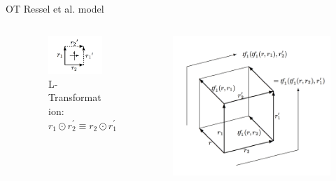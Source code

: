 \documentclass{beamer}
\begin{document}
\begin{frame}{OT Ressel et al. model}

\begin{columns}[c]
  \begin{column}{0.1\textwidth}    	
  \end{column}

  \begin{column}{0.4\textwidth}  
    \begin{figure}
      \centering    
	  \includegraphics[scale=0.3]{OT-MatthiasRessel-2.png}    
      \caption{L-Transformation: $r_1 \odot r_2^{'} \equiv r_2 \odot r_1^{'}$}
    \end{figure}
  \end{column}

  \begin{column}{0.5\textwidth}
    \begin{center}
      \begin{figure}
        \includegraphics[scale=0.25]{OT-MatthiasRessel-1.png}
      \end{figure}
    \end{center}
  \end{column}
\end{columns}	

\end{frame}
\end{document}
